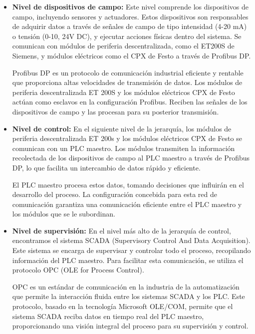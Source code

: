 \begin{itemize}
    \item \textbf{Nivel de dispositivos de campo:} Este nivel comprende los dispositivos de campo, incluyendo sensores y
          actuadores. Estos dispositivos son responsables de adquirir datos a través de señales de campo de tipo intensidad
          (4-20 mA) o tensión (0-10, 24V DC), y ejecutar acciones físicas dentro del sistema. Se comunican con módulos de
          periferia descentralizada, como el ET200S de Siemens, y módulos eléctricos como el CPX de Festo a través de Profibus DP.

          Profibus DP es un protocolo de comunicación industrial eficiente y rentable que proporciona altas velocidades
          de transmisión de datos. Los módulos de periferia descentralizada ET 200S y los módulos eléctricos CPX de Festo
          actúan como esclavos en la configuración Profibus. Reciben las señales de los dispositivos de campo y las
          procesan para su posterior transmisión.


    \item \textbf{Nivel de control:} En el siguiente nivel de la jerarquía, los módulos de periferia descentralizada
          ET 200s y los módulos eléctricos CPX de Festo se comunican con un PLC maestro. Los módulos transmiten la
          información recolectada de los dispositivos de campo al PLC maestro a través de Profibus DP, lo que facilita
          un intercambio de datos rápido y eficiente.

          El PLC maestro procesa estos datos, tomando decisiones que influirán en el desarrollo del proceso. La
          configuración concebida para esta red de comunicación garantiza una comunicación eficiente entre el
          PLC maestro y los módulos que se le subordinan.

    \item \textbf{Nivel de supervisión:} En el nivel más alto de la jerarquía de control, encontramos el
          sistema SCADA (Supervisory Control And Data Acquisition). Este sistema se encarga de supervisar y
          controlar todo el proceso, recopilando información del PLC maestro. Para facilitar esta comunicación,
          se utiliza el protocolo OPC (OLE for Process Control).

          OPC es un estándar de comunicación en la industria de la automatización que permite la interacción
          fluida entre los sistemas SCADA y los PLC. Este protocolo, basado en la tecnología Microsoft OLE/COM,
          permite que el sistema SCADA reciba datos en tiempo real del PLC maestro, proporcionando una visión
          integral del proceso para su supervisión y control.


\end{itemize}

